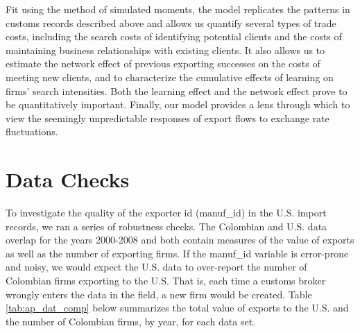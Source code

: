\documentclass[12pt,titlepage]{article}
\begin{document}
Fit using the method of simulated moments, the model replicates the patterns
in customs records described above and allows us quantify several types of
trade costs, including the search costs of identifying potential clients and
the costs of maintaining business relationships with existing clients. It
also allows us to estimate the network effect of previous exporting
successes on the costs of meeting new clients, and to characterize the
cumulative effects of learning on firms' search intensities. Both the
learning effect and the network effect prove to be quantitatively important.
Finally, our model provides a lens through which to view the seemingly
unpredictable responses of export flows to exchange rate fluctuations.




\appendix
\section{Data Checks}
\label{sec:data_check}

To investigate the quality of the exporter id (manuf\_id) in the U.S. import
records, we ran a series of robustness checks. The Colombian and U.S. data
overlap for the years 2000-2008 and both contain measures of the value of
exports as well as the number of exporting firms. If the manuf\_id variable
is error-prone and noisy, we would expect the U.S. data to over-report the
number of Colombian firms exporting to the U.S. That is, each time a customs
broker wrongly enters the data in the field, a new firm would be created.
Table \ref{tab:ap_dat_comp} below summarizes the total value of exports to the U.S. and the
number of Colombian firms, by year, for each data set.
\end{document}
